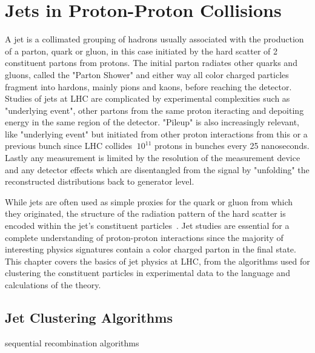 \chapter{Jets in Proton-Proton Collisions}%

A jet is a collimated grouping of hadrons usually associated with the production of a parton, quark or gluon, in this case initiated by the hard scatter of 2 constituent partons from protons. The initial parton radiates other quarks and gluons, called the "Parton Shower" and either way all color charged particles fragment into hardons, mainly pions and kaons,  before reaching the detector. Studies of jets at LHC are complicated by experimental complexities such as "underlying event", other partons from the same proton iteracting and depoiting energy in the same region of the detector. "Pileup" is also increasingly relevant, like "underlying event" but initiated from other proton interactions from this or a previous bunch since LHC collides $~10^{11}$ protons in bunches every 25 nanoseconds. Lastly any measurement is limited by the resolution of the measurement device and any detector effects which are disentangled from the signal by "unfolding" the reconstructed distributions back to generator level.

While jets are often used as simple proxies for the quark or gluon from which they originated, the structure of the radiation pattern of the hard scatter is encoded within the jet's constituent particles~\cite{Asquith:2018igt}. Jet studies are essential for a complete understanding of proton-proton interactions since the majority of interesting physics signatures contain a color charged parton in the final state. This chapter covers the basics of jet physics at LHC, from the algorithms used for clustering the constituent particles in experimental data to the language and calculations of the theory.




\section{Jet Clustering Algorithms}\label{secSM:ch1}





sequential recombination algorithms


